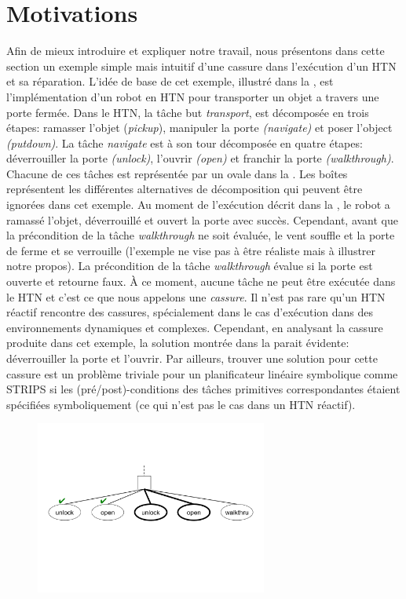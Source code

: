 \documentclass[a4paper,twoside,french]{article}
\begin{document}
		\section{Motivations}
		\label{sec:motivation}
		Afin de mieux introduire et expliquer notre travail, nous présentons dans cette section un exemple simple mais intuitif d'une cassure dans l'exécution d'un HTN et sa réparation. L'idée de base de cet exemple, illustré dans la  , est l'implémentation d'un robot en HTN pour transporter un objet a travers une porte fermée. Dans le HTN, la tâche but {\em transport}, est décomposée en trois étapes: ramasser l'objet ({\em pickup}), manipuler la porte {\em(navigate)} et poser l'object {\em(putdown)}. La tâche {\em navigate} est à son tour décomposée en quatre étapes: déverrouiller  la porte {\em(unlock)}, l'ouvrir {\em(open)} et franchir la porte {\em(walkthrough)}. Chacune de ces tâches est représentée par un ovale dans la . Les boîtes représentent les différentes alternatives de décomposition qui peuvent être ignorées dans cet exemple. Au moment de l'exécution décrit dans la , le robot a ramassé l'objet, déverrouillé et ouvert la porte avec succès. Cependant, avant que la précondition de la tâche {\em walkthrough} ne soit évaluée, le vent souffle et la porte de ferme et se verrouille (l'exemple ne vise pas à être réaliste mais à illustrer notre propos). La précondition de la tâche {\em walkthrough} évalue si la porte est ouverte et retourne faux. À ce moment, aucune tâche ne peut être exécutée dans le HTN et c'est ce que nous appelons une {\em cassure}. Il n'est pas rare qu'un HTN réactif rencontre des cassures, spécialement dans le cas d'exécution dans des environnements dynamiques et complexes. Cependant, en analysant la cassure produite dans cet exemple, la solution montrée dans la  parait évidente: déverrouiller la porte et l'ouvrir. Par ailleurs, trouver une solution pour cette cassure est un problème triviale pour un planificateur linéaire symbolique comme STRIPS si les (pré/post)-conditions des tâches primitives correspondantes étaient spécifiées symboliquement (ce qui n'est pas le cas dans un HTN réactif).		
			\begin{figure}[t]
				\centerline{\includegraphics[width=3in]{figs/recover}}
				\vskip 8pt
			\end{figure}
	
\end{document}
